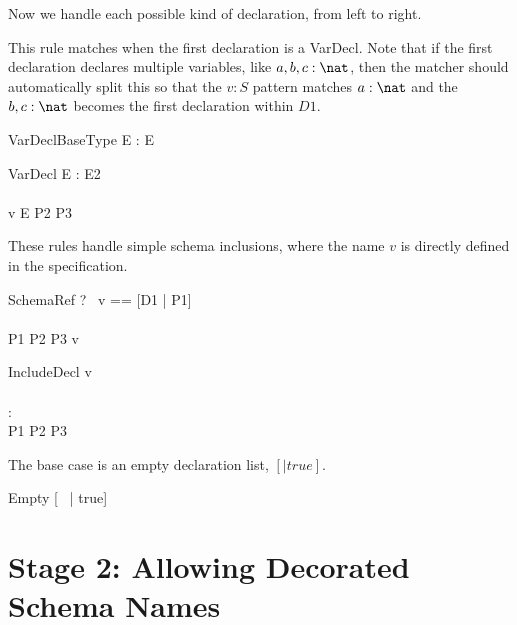 \documentclass{article}
\begin{document}
Now we handle each possible kind of declaration, from left to right.

This rule matches when the first declaration is a VarDecl.
Note that if the first declaration declares multiple variables,
like $a,b,c:\nat$, then the matcher should automatically split this
so that the $v:S$ pattern matches $a:\nat$ and the $b,c:\nat$
becomes the first declaration within $D1$.

\begin{zedrule}{VarDeclBaseType}
   \proviso E : \power E \\
   [D1 | true] \unfoldsTo [D2 | P2]
\derives
   [v:E; D1 | true] \unfoldsTo [v:E; D2 | P2]
\end{zedrule}

\begin{zedrule}{VarDecl}
   \proviso E : \power E2 \\
   [D1 | true] \unfoldsTo [D2 | P2] \\
   v \in E \land P2 \iff P3
\derives
   [v:E; D1 | true] \unfoldsTo [v:E2; D2 | P3]
\end{zedrule}

These rules handle simple schema inclusions, where the name $v$ is
directly defined in the specification.

\begin{zedrule}{SchemaRef}
  \proviso ?~ v == [D1 | P1] \\
  [D1 | true] \unfoldsTo [D2 | P2] \\
  P1 \land P2 \iff P3
\derives
  v \unfoldsTo [D2 | P3]
\end{zedrule}


\begin{zedrule}{IncludeDecl}
   v \unfoldsTo [D1 | P1] \\
   [D | true] \unfoldsTo [D2 | P2] \\
   \proviso [D1 | true] \land [D2 | true] : \power [D3] \\
   P1 \land P2 \iff P3
\derives
   [v; D | true] \unfoldsTo [D3 | P3]
\end{zedrule}

The base case is an empty declaration list, $[|true]$.
\begin{zedrule}{Empty}
   [~ | true] \unfoldsTo [~ | true]
\end{zedrule}


\section*{Stage 2: Allowing Decorated Schema Names}
\end{document}
